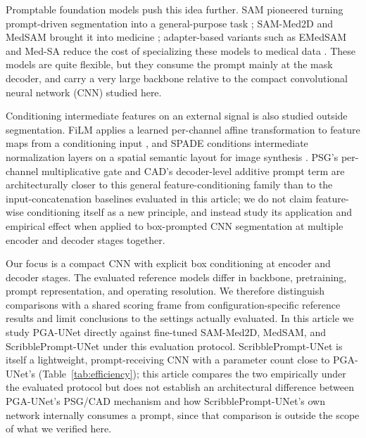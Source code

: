 Promptable foundation models push this idea further. SAM pioneered turning prompt-driven segmentation into a general-purpose task \cite{b1}; SAM-Med2D and MedSAM brought it into medicine \cite{b2,b9}; adapter-based variants such as EMedSAM and Med-SA reduce the cost of specializing these models to medical data \cite{b12,b13}. These models are quite flexible, but they consume the prompt mainly at the mask decoder, and carry a very large backbone relative to the compact convolutional neural network (CNN) studied here.

Conditioning intermediate features on an external signal is also studied outside segmentation. FiLM applies a learned per-channel affine transformation to feature maps from a conditioning input \cite{b15}, and SPADE conditions intermediate normalization layers on a spatial semantic layout for image synthesis \cite{b16}. PSG's per-channel multiplicative gate and CAD's decoder-level additive prompt term are architecturally closer to this general feature-conditioning family than to the input-concatenation baselines evaluated in this article; we do not claim feature-wise conditioning itself as a new principle, and instead study its application and empirical effect when applied to box-prompted CNN segmentation at multiple encoder and decoder stages together.

Our focus is a compact CNN with explicit box conditioning at encoder and decoder stages. The evaluated reference models differ in backbone, pretraining, prompt representation, and operating resolution. We therefore distinguish comparisons with a shared scoring frame from configuration-specific reference results and limit conclusions to the settings actually evaluated. In this article we study PGA-UNet directly against fine-tuned SAM-Med2D, MedSAM, and ScribblePrompt-UNet under this evaluation protocol. ScribblePrompt-UNet is itself a lightweight, prompt-receiving CNN with a parameter count close to PGA-UNet's (Table~\ref{tab:efficiency}); this article compares the two empirically under the evaluated protocol but does not establish an architectural difference between PGA-UNet's PSG/CAD mechanism and how ScribblePrompt-UNet's own network internally consumes a prompt, since that comparison is outside the scope of what we verified here.

